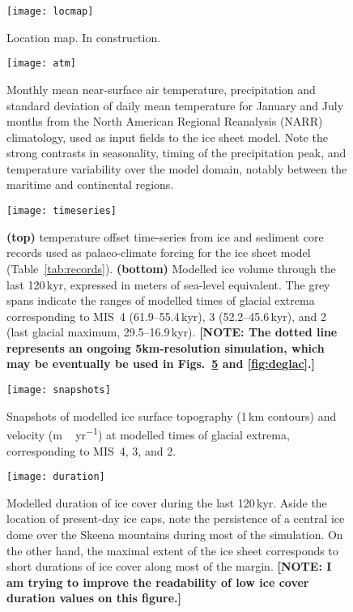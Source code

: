 \documentclass[tc, ms]{copernicus}
\newcommand{\note}[1]{\textbf{[NOTE: #1]}}
\begin{document}
\begin{figure}
  \texttt{[image: locmap]}
  \caption{Location map. In construction.}
  \label{fig:locmap}
\end{figure}

\begin{figure}
  \texttt{[image: atm]}
  \caption{Monthly mean near-surface air temperature, precipitation and
           standard deviation of daily mean temperature for January and July
           months from the North American Regional Reanalysis (NARR)
           climatology, used as input fields to the ice sheet model. Note the
           strong contrasts in seasonality, timing of the precipitation peak,
           and temperature variability over the model domain, notably between
           the maritime and continental regions.}
  \label{fig:atm}
\end{figure}

\begin{figure}
  \texttt{[image: timeseries]}
  \caption{\textbf{(top)} temperature offset time-series from ice and sediment
           core records used as palaeo-climate forcing for the ice sheet model
           (Table~\ref{tab:records}). \textbf{(bottom)} Modelled ice volume
           through the last 120\,\unit{kyr}, expressed in meters of sea-level
           equivalent. The grey spans indicate the ranges of modelled times of
           glacial extrema corresponding to MIS~4 (61.9--55.4\,\unit{kyr}), 3
           (52.2--45.6\,\unit{kyr}), and 2 (last glacial maximum,
           29.5--16.9\,\unit{kyr}).
           \note{The dotted line represents an ongoing 5km-resolution
           simulation, which may be eventually be used in
           Figs.~\ref{fig:duration} and \ref{fig:deglac}.}}
  \label{fig:timeseries}
\end{figure}

\begin{figure}
  \texttt{[image: snapshots]}
  \caption{Snapshots of modelled ice surface topography (1\,\unit{km} contours)
           and velocity (\unit{m\,yr^{-1}}) at modelled times of glacial
           extrema, corresponding to MIS~4, 3, and 2.}
  \label{fig:snapshots}
\end{figure}

\begin{figure}
  \texttt{[image: duration]}
  \caption{Modelled duration of ice cover during the last 120\,\unit{kyr}.
           Aside the location of present-day ice caps, note the persistence of
           a central ice dome over the Skeena mountains during most of the
           simulation. On the other hand, the maximal extent of the ice sheet
           corresponds to short durations of ice cover along most of the
           margin.
           \note{I am trying to improve the readability of low ice cover
           duration values on this figure.}}
  \label{fig:duration}
\end{figure}
\end{document}
